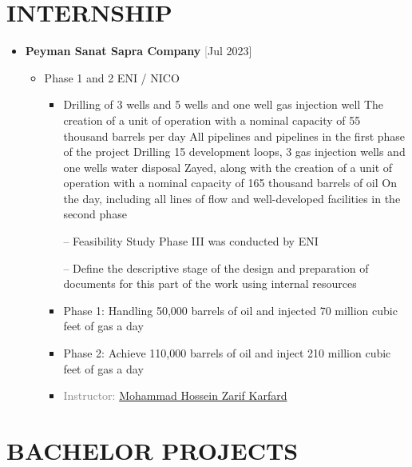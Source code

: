 \documentclass[10pt,a4paper,sans]{moderncv} %
\begin{document}
	\section{INTERNSHIP}
	\begin{itemize}
		\item {}  \textbf{Peyman Sanat Sapra Company}  \textcolor{gray}     \hfill\textcolor{gray}   [Jul 2023]
		\begin{itemize}
			\item Phase 1 and 2 ENI / NICO


			\begin{itemize} 
		     	\item Drilling of 3 wells and 5 wells and one well gas injection well The creation of a unit of operation with a nominal capacity of 55 thousand barrels per day All pipelines and pipelines in the first phase of the project Drilling 15 development loops, 3 gas injection wells and one wells water disposal Zayed, along with the creation of a unit of operation with a nominal capacity of 165 thousand barrels of oil On the day, including all lines of flow and well-developed facilities in the second phase

                 – Feasibility Study Phase III was conducted by ENI

                 – Define the descriptive stage of the design and preparation of documents for this part of the work using internal resources
		     	\item Phase 1: Handling 50,000 barrels of oil and injected 70 million cubic feet of gas a day
				\item Phase 2: Achieve 110,000 barrels of oil and inject 210 million cubic feet of gas a day
				\item \textcolor{gray}{Instructor: \href{http://pssapra.ir/}{Mohammad Hossein Zarif Karfard}}
			\end{itemize}
			

			
		\end{itemize}
	\end{itemize}

\section{BACHELOR PROJECTS} 
\end{document}
